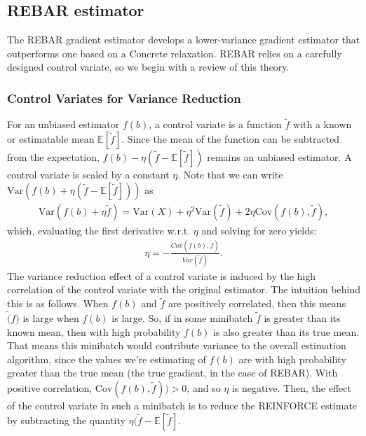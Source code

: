 \documentclass{article}
\newcommand{\var}{\text{Var}}
\begin{document}
\subsection{REBAR estimator}

The REBAR gradient estimator develops a lower-variance gradient estimator that outperforms one based on a Concrete relaxation. REBAR relies on a carefully designed control variate, so we begin with a review of this theory.

\subsubsection{Control Variates for Variance Reduction}
For an unbiased estimator $f(b)$, a control variate is a function $\tilde{f}$ with a known or estimatable mean $\mathbb{E}[\tilde{f}]$. Since the mean of the function can be subtracted from the expectation, $f(b) - \eta (\tilde{f}-\mathbb{E}[\tilde{f}])$ remains an unbiased estimator.
A control variate is scaled by a constant $\eta$.
Note that we can write $\text{Var}(f(b)+\eta(\tilde{f}-\mathbb{E}[\tilde{f}]))$ as
\begin{align}
    \text{Var}(f(b)+\eta \tilde{f}) = \text{Var}(X) + \eta^2\var(\tilde{f}) + 2 \eta \text{Cov}(f(b),\tilde{f}),
\end{align}
which, evaluating the first derivative w.r.t. $\eta$ and solving for zero yields:
\begin{align}
    \eta = -\frac{Cov(f(b), \tilde{f})}{Var(\tilde{f})}.
\end{align}
The variance reduction effect of a control variate is induced by the high correlation of the control variate with the original estimator.
The intuition behind this is as follows.
When $f(b)$ and $\tilde{f}$ are positively correlated, then this means $\tilde(f)$ is large when $f(b)$ is large.
So, if in some minibatch $\tilde{f}$ is greater than its known mean, then with high probability $f(b)$ is also greater than its true mean.
That means this minibatch would contribute variance to the overall estimation algorithm, since the values we're estimating of $f(b)$ are with high probability greater than the true mean (the true gradient, in the case of REBAR). 
With positive correlation, $\text{Cov}(f(b), \tilde{f})) > 0$, and so $\eta$ is negative. 
Then, the effect of the control variate in such a minibatch is to reduce the REINFORCE estimate by subtracting the quantity $\eta(\tilde{f} - \mathbb{E}[\tilde{f}]$.
\end{document}
